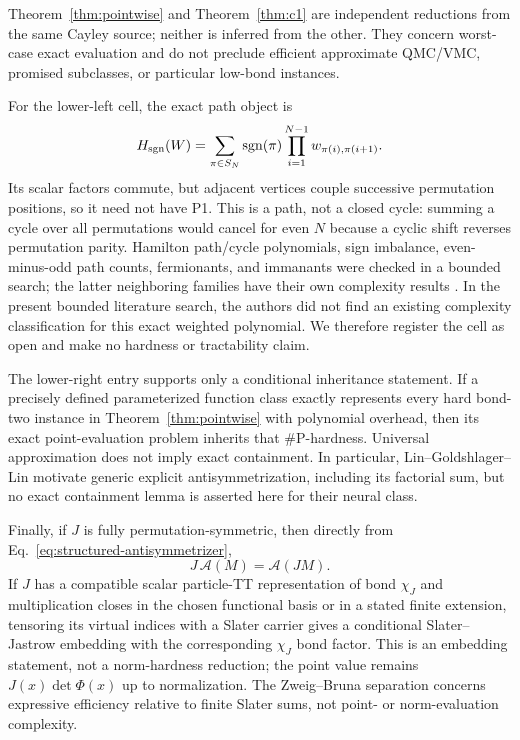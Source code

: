 \documentclass[11pt]{article}
\theoremstyle{definition}
\begin{document}
Theorem~\ref{thm:pointwise} and Theorem~\ref{thm:c1} are independent reductions
from the same Cayley source; neither is inferred from the other.  They concern
worst-case exact evaluation and do not preclude efficient approximate QMC/VMC,
promised subclasses, or particular low-bond instances.

For the lower-left cell, the exact path object is
\begin{equation}
 H_{\rm sgn}(W)=\sum_{\pi\in S_N}\operatorname{sgn}(\pi)
 \prod_{i=1}^{N-1}w_{\pi(i),\pi(i+1)}.
 \label{eq:signed-path}
\end{equation}
Its scalar factors commute, but adjacent vertices couple successive
permutation positions, so it need not have P1.  This is a path, not a closed
cycle: summing a cycle over all permutations would cancel for even $N$ because
a cyclic shift reverses permutation parity.  Hamilton path/cycle polynomials,
sign imbalance, even-minus-odd path counts, fermionants, and immanants were
checked in a bounded search; the latter neighboring families have their own
complexity results \cite{MertensMoore2013Fermionant}.  In the present bounded
literature search, the authors did not find an existing complexity
classification for this exact weighted polynomial.  We therefore register
the cell as open and make no hardness or tractability claim.

The lower-right entry supports only a conditional inheritance statement.  If
a precisely defined parameterized function class exactly represents every
hard bond-two instance in Theorem~\ref{thm:pointwise} with polynomial overhead,
then its exact point-evaluation problem inherits that \#P-hardness.  Universal
approximation does not imply exact containment.  In particular,
Lin--Goldshlager--Lin motivate generic explicit antisymmetrization, including
its factorial sum, but no exact containment lemma is asserted here for their
neural class.

Finally, if $J$ is fully permutation-symmetric, then directly from
Eq.~\eqref{eq:structured-antisymmetrizer},
\begin{equation}
 J\,\mathcal A(M)=\mathcal A(JM).
 \label{eq:jastrow-commutes}
\end{equation}
If $J$ has a compatible scalar particle-TT representation of bond $\chi_J$
and multiplication closes in the chosen functional basis or in a stated
finite extension, tensoring its virtual indices with a Slater carrier gives a
conditional Slater--Jastrow embedding with the corresponding $\chi_J$ bond
factor.  This is an embedding statement, not a norm-hardness reduction; the
point value remains $J(x)\det\Phi(x)$ up to normalization.  The
Zweig--Bruna separation concerns expressive efficiency relative to finite
Slater sums, not point- or norm-evaluation complexity.
\end{document}

